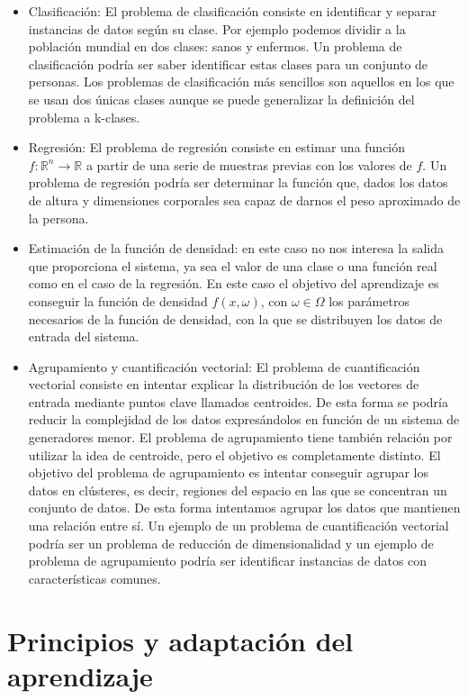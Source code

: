 \begin{itemize}
	\item Clasificación: El problema de clasificación consiste en identificar y separar instancias de datos según su clase. Por ejemplo podemos dividir a la población mundial en dos clases: sanos y enfermos. Un problema de clasificación podría ser saber identificar estas clases para un conjunto de personas. Los problemas de clasificación más sencillos son aquellos en los que se usan dos únicas clases aunque se puede generalizar la definición del problema a k-clases.
	\item Regresión: El problema de regresión consiste en estimar una función $f: \mathbb{R}^n \rightarrow \mathbb{R}$ a partir de una serie de muestras previas con los valores de $f$. Un problema de regresión podría ser determinar la función que, dados los datos de altura y dimensiones corporales sea capaz de darnos el peso aproximado de la persona.
	\item Estimación de la función de densidad: en este caso no nos interesa la salida que proporciona el sistema, ya sea el valor de una clase o una función real como en el caso de la regresión. En este caso el objetivo del aprendizaje es conseguir la función de densidad $f(x,\omega)$, con $\omega \in \Omega$ los parámetros necesarios de la función de densidad, con la que se distribuyen los datos de entrada del sistema.
	\item Agrupamiento y cuantificación vectorial: El problema de cuantificación vectorial consiste en intentar explicar la distribución de los vectores de entrada mediante puntos clave llamados centroides. De esta forma se podría reducir la complejidad de los datos expresándolos en función de un sistema de generadores menor. El problema de agrupamiento tiene también relación por utilizar la idea de centroide, pero el objetivo es completamente distinto. El objetivo del problema de agrupamiento es intentar conseguir agrupar los datos en clústeres, es decir, regiones del espacio en las que se concentran un conjunto de datos. De esta forma intentamos agrupar los datos que mantienen una relación entre sí. Un ejemplo de un problema de cuantificación vectorial podría ser un problema de reducción de dimensionalidad y un ejemplo de problema de agrupamiento podría ser identificar instancias de datos con características comunes.
\end{itemize}

\section{Principios y adaptación del aprendizaje}

